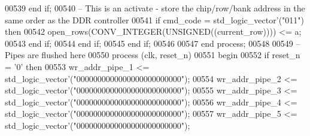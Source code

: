 \begin{DoxyCode}
00539         \textcolor{keywordflow}{end} \textcolor{keywordflow}{if};
00540 \textcolor{keyword}{        -- This is an activate - store the chip/row/bank address in the same order as the DDR controller}
00541         \textcolor{keywordflow}{if} \textcolor{vhdlchar}{cmd_code} \textcolor{vhdlchar}{=} \textcolor{comment}{std\_logic\_vector}\textcolor{vhdlchar}{'}\textcolor{vhdlchar}{(}\textcolor{vhdllogic}{"011"}\textcolor{vhdlchar}{)} \textcolor{keywordflow}{then} 
00542           \textcolor{vhdlchar}{open_rows}\textcolor{vhdlchar}{(}\textcolor{vhdlchar}{CONV\_INTEGER}\textcolor{vhdlchar}{(}\textcolor{comment}{UNSIGNED}\textcolor{vhdlchar}{(}\textcolor{vhdlchar}{(}\textcolor{vhdlchar}{current_row}\textcolor{vhdlchar}{)}\textcolor{vhdlchar}{)}\textcolor{vhdlchar}{)}\textcolor{vhdlchar}{)} \textcolor{vhdlchar}{<=} \textcolor{vhdlchar}{a};
00543         \textcolor{keywordflow}{end} \textcolor{keywordflow}{if};
00544       \textcolor{keywordflow}{end} \textcolor{keywordflow}{if};
00545     \textcolor{keywordflow}{end} \textcolor{keywordflow}{if};
00546 
00547   \textcolor{keywordflow}{end} \textcolor{keywordflow}{process};
00548 
00549 \textcolor{keyword}{  -- Pipes are flushed here}
00550   \textcolor{keywordflow}{process} (clk, reset_n)
00551 \textcolor{vhdlkeyword}{  begin}
00552     \textcolor{keywordflow}{if} \textcolor{vhdlchar}{reset_n} \textcolor{vhdlchar}{=} \textcolor{vhdlchar}{'}\textcolor{vhdllogic}{}\textcolor{vhdllogic}{0}\textcolor{vhdlchar}{'} \textcolor{keywordflow}{then}
00553       \textcolor{vhdlchar}{wr_addr_pipe_1} \textcolor{vhdlchar}{<=} \textcolor{comment}{std\_logic\_vector}\textcolor{vhdlchar}{'}\textcolor{vhdlchar}{(}\textcolor{vhdllogic}{"0000000000000000000000000"}\textcolor{vhdlchar}{)};
00554       \textcolor{vhdlchar}{wr_addr_pipe_2} \textcolor{vhdlchar}{<=} \textcolor{comment}{std\_logic\_vector}\textcolor{vhdlchar}{'}\textcolor{vhdlchar}{(}\textcolor{vhdllogic}{"0000000000000000000000000"}\textcolor{vhdlchar}{)};
00555       \textcolor{vhdlchar}{wr_addr_pipe_3} \textcolor{vhdlchar}{<=} \textcolor{comment}{std\_logic\_vector}\textcolor{vhdlchar}{'}\textcolor{vhdlchar}{(}\textcolor{vhdllogic}{"0000000000000000000000000"}\textcolor{vhdlchar}{)};
00556       \textcolor{vhdlchar}{wr_addr_pipe_4} \textcolor{vhdlchar}{<=} \textcolor{comment}{std\_logic\_vector}\textcolor{vhdlchar}{'}\textcolor{vhdlchar}{(}\textcolor{vhdllogic}{"0000000000000000000000000"}\textcolor{vhdlchar}{)};
00557       \textcolor{vhdlchar}{wr_addr_pipe_5} \textcolor{vhdlchar}{<=} \textcolor{comment}{std\_logic\_vector}\textcolor{vhdlchar}{'}\textcolor{vhdlchar}{(}\textcolor{vhdllogic}{"0000000000000000000000000"}\textcolor{vhdlchar}{)};

\end{DoxyCode}

